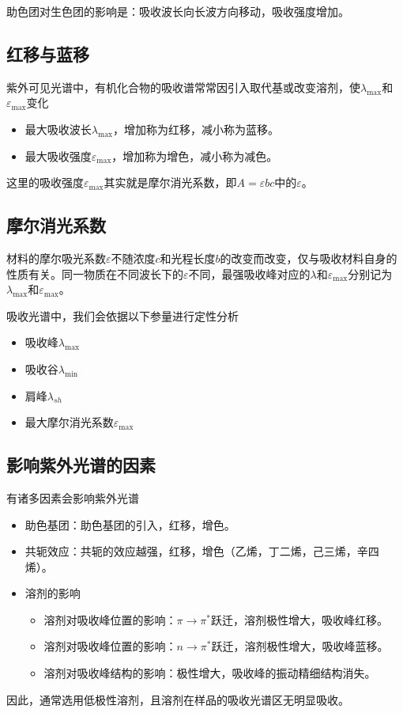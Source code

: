 助色团对生色团的影响是：吸收波长向长波方向移动，吸收强度增加。

\subsection{红移与蓝移}
紫外可见光谱中，有机化合物的吸收谱常常因引入取代基或改变溶剂，使$\lambda_{\max}$和$\varepsilon_{\max}$变化
\begin{itemize}
    \item 最大吸收波长$\lambda_{\max}$，增加称为红移，减小称为蓝移。
    \item 最大吸收强度$\varepsilon_{\max}$，增加称为增色，减小称为减色。
\end{itemize}
这里的吸收强度$\varepsilon_{\max}$其实就是摩尔消光系数，即$A=\varepsilon bc$中的$\varepsilon$。

\subsection{摩尔消光系数}
材料的摩尔吸光系数$\varepsilon$不随浓度$c$和光程长度$b$的改变而改变，仅与吸收材料自身的性质有关。同一物质在不同波长下的$\varepsilon$不同，最强吸收峰对应的$\lambda$和$\varepsilon_{\max}$分别记为$\lambda_{\max}$和$\varepsilon_{\max}$。\goodbreak

吸收光谱中，我们会依据以下参量进行定性分析
\begin{itemize}
    \item 吸收峰$\lambda_{\max}$
    \item 吸收谷$\lambda_{\min}$
    \item 肩峰$\lambda_{sh}$
    \item 最大摩尔消光系数$\varepsilon_{\max}$
\end{itemize}

\subsection{影响紫外光谱的因素}
有诸多因素会影响紫外光谱
\begin{itemize}
    \item 助色基团：助色基团的引入，红移，增色。
    \item 共轭效应：共轭的效应越强，红移，增色（乙烯，丁二烯，己三烯，辛四烯）。
    \item 溶剂的影响
    \begin{itemize}
        \item 溶剂对吸收峰位置的影响：$\pi\to\pi^{*}$跃迁，溶剂极性增大，吸收峰红移。
        \item 溶剂对吸收峰位置的影响：$n\to\pi^{*}$跃迁，溶剂极性增大，吸收峰蓝移。
        \item 溶剂对吸收峰结构的影响：极性增大，吸收峰的振动精细结构消失。
    \end{itemize}
\end{itemize}
因此，通常选用低极性溶剂，且溶剂在样品的吸收光谱区无明显吸收。